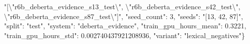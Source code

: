 "[\textbackslash{}"r6b\_deberta\_evidence\_s13\_test\textbackslash{}", \textbackslash{}"r6b\_deberta\_evidence\_s42\_test\textbackslash{}", \textbackslash{}"r6b\_deberta\_evidence\_s87\_test\textbackslash{}"]", "seed\_count": 3, "seeds": "[13, 42, 87]", "split": "test", "system": "deberta\_evidence", "train\_gpu\_hours\_mean": 0.3221, "train\_gpu\_hours\_std": 0.002740437921208936, "variant": "lexical\_negatives"\}
